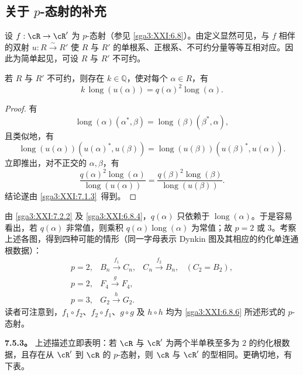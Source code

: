 \subsection{关于 \(p\)-态射的补充}\label{sga3:XXI:7.5}

设 \(f:\cR\to\cR'\) 为 \(p\)-态射（参见 \ref{sga3:XXI:6.8}）。由定义显然可见，与 \(f\) 相伴的双射 \(u:R\xrightarrow{\sim}R'\) 使 \(R\) 与 \(R'\) 的单根系、正根系、不可约分量等等互相对应。因此为简单起见，可设 \(R\) 与 \(R'\) 不可约。

\begin{lemma}\label{sga3:XXI:7.5.1}
若 \(R\) 与 \(R'\) 不可约，则存在 \(k\in\mathbb Q\)，使对每个 \(\alpha\in R\)，有
\[
 k\,\operatorname{long}(u(\alpha))
 =
 q(\alpha)^2\operatorname{long}(\alpha).
\]
\end{lemma}

\begin{proof}
有
\[
 \operatorname{long}(\alpha)(\alpha^\ast,\beta)
 =
 \operatorname{long}(\beta)(\beta^\ast,\alpha),
\]
且类似地，有
\[
 \operatorname{long}(u(\alpha))
   (u(\alpha)^\ast,u(\beta))
 =
 \operatorname{long}(u(\beta))
   (u(\beta)^\ast,u(\alpha)).
\]
立即推出，对不正交的 \(\alpha,\beta\)，有
\[
 \frac{q(\alpha)^2\operatorname{long}(\alpha)}
      {\operatorname{long}(u(\alpha))}
 =
 \frac{q(\beta)^2\operatorname{long}(\beta)}
      {\operatorname{long}(u(\beta))}.
\]
结论遂由 \ref{sga3:XXI:7.1.3}\, 得到。
\end{proof}

\begin{remark}\label{sga3:XXI:7.5.2}
由 \ref{sga3:XXI:7.2.2} 及 \ref{sga3:XXI:6.8.4}，\(q(\alpha)\) 只依赖于 \(\operatorname{long}(\alpha)\)。于是容易看出，若 \(q(\alpha)\) 非常值，则乘积 \(q(\alpha)\operatorname{long}(\alpha)\) 为常值；故 \(p=2\) 或 \(3\)。考察上述各图，得到四种可能的情形（同一字母表示 Dynkin 图及其相应的约化单连通根数据）：
\[
\begin{array}{llll}
p=2, & B_n\xrightarrow{\,f_1\,}C_n,
     & C_n\xrightarrow{\,f_2\,}B_n,
     & (C_2=B_2),\\
p=2, & F_4\xrightarrow{\,g\,}F_4,\\
p=3, & G_2\xrightarrow{\,h\,}G_2.
\end{array}
\]
读者可注意到，\(f_1\circ f_2\)、\(f_2\circ f_1\)、\(g\circ g\) 及 \(h\circ h\) 均为 \ref{sga3:XXI:6.8.6} 所述形式的 \(p\)-态射。
\end{remark}

\medskip
\noindent\textbf{7.5.3。}\label{sga3:XXI:7.5.3}
上述描述立即表明：若 \(\cR\) 与 \(\cR'\) 为两个半单秩至多为 \(2\) 的约化根数据，且存在从 \(\cR'\) 到 \(\cR\) 的 \(p\)-态射，则 \(\cR\) 与 \(\cR'\) 的型相同。更确切地，有下表。

